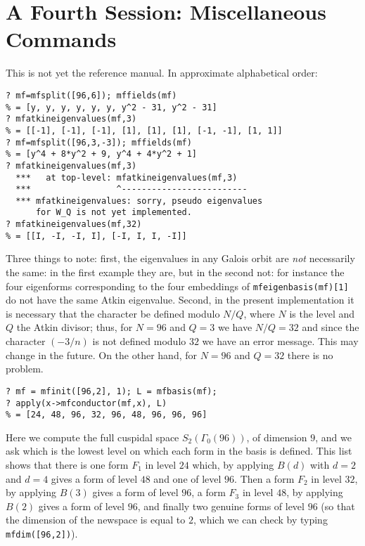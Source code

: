 \documentclass[11pt]{article}
\newcommand{\G}{\Gamma}
\def\kbd#1{{\tt #1}}
\begin{document}
\section{A Fourth Session: Miscellaneous Commands}

This is not yet the reference manual. In approximate alphabetical order:

\begin{verbatim}
? mf=mfsplit([96,6]); mffields(mf)
% = [y, y, y, y, y, y, y^2 - 31, y^2 - 31]
? mfatkineigenvalues(mf,3)
% = [[-1], [-1], [-1], [1], [1], [1], [-1, -1], [1, 1]]
? mf=mfsplit([96,3,-3]); mffields(mf)
% = [y^4 + 8*y^2 + 9, y^4 + 4*y^2 + 1]
? mfatkineigenvalues(mf,3)
  ***   at top-level: mfatkineigenvalues(mf,3)
  ***                 ^-------------------------
  *** mfatkineigenvalues: sorry, pseudo eigenvalues
      for W_Q is not yet implemented.
? mfatkineigenvalues(mf,32)
% = [[I, -I, -I, I], [-I, I, I, -I]]
\end{verbatim}

Three things to note: first, the eigenvalues in any Galois orbit are \emph{not}
necessarily the same: in the first example they are, but in the second not:
for instance the four eigenforms corresponding to the four embeddings of
\kbd{mfeigenbasis(mf)[1]} do not have the same Atkin eigenvalue. Second, in
the present implementation it is necessary that the character be defined
modulo $N/Q$, where $N$ is the level and $Q$ the Atkin divisor; thus, for
$N=96$ and $Q=3$ we have $N/Q=32$ and since the character $(-3/n)$ is not
defined modulo $32$ we have an error message. This may change in the future.
On the other hand, for $N=96$ and $Q=32$ there is no problem.

\medskip

\begin{verbatim}
? mf = mfinit([96,2], 1); L = mfbasis(mf);
? apply(x->mfconductor(mf,x), L)
% = [24, 48, 96, 32, 96, 48, 96, 96, 96]
\end{verbatim}

Here we compute the full cuspidal space $S_2(\G_0(96))$, of dimension $9$,
and we ask which is the lowest level on which each form in the basis
is defined. This list shows that there is one form $F_1$ in level $24$
which, by applying $B(d)$ with $d=2$ and $d=4$ gives a form of level $48$
and one of level $96$. Then a form $F_2$ in level $32$, by applying $B(3)$
gives a form of level $96$, a form $F_3$ in level $48$, by applying $B(2)$
gives a form of level $96$, and finally two genuine forms of level $96$
(so that the dimension of the newspace is equal to $2$, which we can check
by typing \kbd{mfdim([96,2])}).
\end{document}
